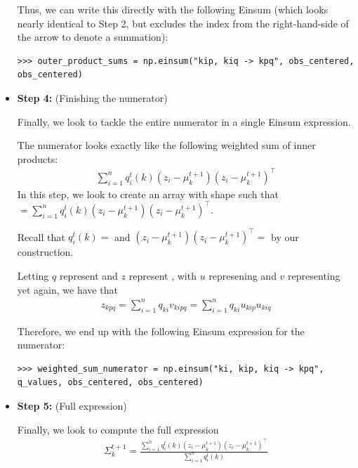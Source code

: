 \begin{itemize}
Thus, we can write this directly with the following Einsum (which looks nearly identical to Step 2, but excludes the index  from the right-hand-side of the arrow to denote a summation):
\begin{lstlisting}
>>> outer_product_sums = np.einsum("kip, kiq -> kpq", obs_centered, obs_centered)
\end{lstlisting}

\item \textbf{Step 4:} (Finishing the numerator)

Finally, we look to tackle the entire numerator in a single Einsum expression.

The numerator looks exactly like the following weighted sum of inner products:
\begin{align*}
	\sum_{i=1}^{n} q_i^t(k) (z_i - \mu_k^{t+1})(z_i - \mu_k^{t+1})^\top
\end{align*}
In this step, we look to create an array  with shape  such that \newline {} $ = \sum_{i=1}^{n}  q_i^t(k) (z_i - \mu_k^{t+1}) (z_i - \mu_k^{t+1})^\top$. 

Recall that $q_i^t(k) = $  and $(z_i - \mu_k^{t+1}) (z_i - \mu_k^{t+1})^\top = $  by our construction.

Letting $q$ represent  and $z$ represent , with $u$ represening  and $v$ representing  yet again, we have that 
\begin{align*}
	z_{kpq} = \sum_{i=1}^{n}q_{ki}v_{kipq} = \sum_{i=1}^{n}q_{ki}u_{kip}u_{kiq}
\end{align*}

Therefore, we end up with the following Einsum expression for the numerator:
\begin{lstlisting}
>>> weighted_sum_numerator = np.einsum("ki, kip, kiq -> kpq", q_values, obs_centered, obs_centered)
\end{lstlisting}

\item \textbf{Step 5:} (Full expression)

Finally, we look to compute the full expression 
\begin{align*}
	\Sigma_k^{t+1} = \frac{\sum_{i=1}^{n} q_i^t(k) (z_i - \mu_k^{t+1}) (z_i - \mu_k^{t+1})^\top}{\sum_{i=1}^{n} q_i^t(k)}
\end{align*}


\end{itemize}
